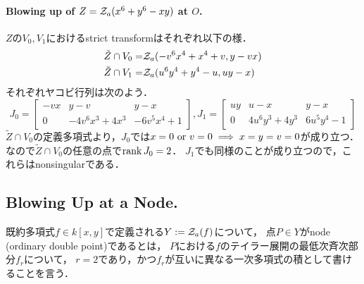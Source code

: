 \documentclass[a4paper]{jsarticle}
\begin{document}
    \paragraph{Blowing up of $Z=\mathcal{Z}_a(x^6+y^6-xy)$ at $O$.}
    $Z$の$V_0, V_1$におけるstrict transformはそれぞれ以下の様．
    \begin{align*}
        \tilde{Z} \cap V_0=& \mathcal{Z}_a(-v^6 x^4+x^4+v, y-vx) \\
        \tilde{Z} \cap V_1=& \mathcal{Z}_a(u^6 y^4+y^4-u, uy-x)
    \end{align*}
    それぞれヤコビ行列は次のよう．
    \[
        J_0=
        \begin{bmatrix}
            -vx & y-v & y-x \\
            0 & -4v^6x^3+4x^3 & -6v^5x^4+1
        \end{bmatrix},
        J_1=
        \begin{bmatrix}
            uy & u-x & y-x \\
            0 & 4u^6y^3+4y^3 & 6u^5 y^4-1
        \end{bmatrix}
    \]
    $\tilde{Z} \cap V_0$の定義多項式より，$J_0$では$x=0 \text{ or } v=0 \implies x=y=v=0$が成り立つ．
    なので$\tilde{Z} \cap V_0$の任意の点で$\operatorname{rank} J_0=2$．
    $J_1$でも同様のことが成り立つので，これらはnonsingularである．

    \subsection{Blowing Up at a Node.}
    既約多項式$f \in k[x,y]$で定義される$Y:=\mathcal{Z}_a(f)$について，
    点$P \in Y$がnode (ordinary double point)であるとは，
    $P$における$f$のテイラー展開の最低次斉次部分$f_r$について，
    $r=2$であり，かつ$f_r$が互いに異なる一次多項式の積として書けることを言う．
\end{document}
